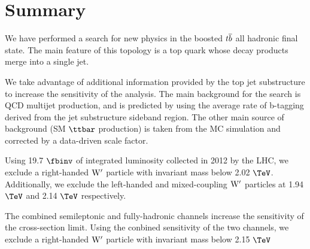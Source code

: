 \clearpage
\newpage
\section{Summary}
\label{sec:summary}
We have performed a search for new physics in the boosted ${t\overline{b}}$ all
hadronic final state.  The main feature of this topology is a top quark
whose decay products merge into a single jet. 

We take advantage of additional information provided by the top jet
substructure to increase the sensitivity of the analysis.  The main background for
the search is QCD multijet production, and is predicted by using the
average rate of b-tagging derived from the jet substructure sideband
region.  The other main source of background (SM $\ttbar$ production) is taken from 
the MC simulation and corrected by a data-driven scale factor.

Using 19.7$~\fbinv$ of integrated luminosity collected in 2012 by the
LHC, we exclude a right-handed $\mathrm{W}^\prime$ particle with invariant mass
below 2.02 $\TeV$.  Additionally, we exclude the left-handed and mixed-coupling $\mathrm{W}^\prime$ particles at 1.94 $\TeV$ and 2.14 $\TeV$ respectively.

The combined semileptonic and fully-hadronic channels increase the sensitivity of the cross-section limit.  
Using the conbined sensitivity of the two channels, we exclude a right-handed $\mathrm{W}^\prime$ particle with invariant mass below 2.15$~\TeV$  
